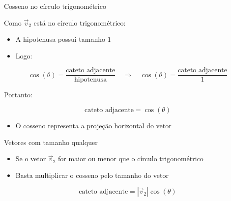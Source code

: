 \documentclass{beamer}
\begin{document}
\begin{frame}{Cosseno no círculo trigonométrico}


\vspace{0.5cm}

Como $\vec{v}_2$ está no círculo trigonométrico:

\begin{itemize}
    \item A hipotenusa possui tamanho $1$
    \item Logo:
\end{itemize}

\vspace{0.5cm}

\[
\cos(\theta)
=
\frac{\text{cateto adjacente}}
{\text{hipotenusa}}
\quad
\Longrightarrow
\quad
\cos(\theta)
=
\frac{\text{cateto adjacente}}{1}
\]
\vspace{0.5cm}

Portanto:

\[
\boxed{
\text{cateto adjacente} = \cos(\theta)
}
\]

\vspace{0.4cm}

\begin{itemize}
    \item O cosseno representa a projeção horizontal do vetor
\end{itemize}

\end{frame}
\begin{frame}{Vetores com tamanho qualquer}


\vspace{0.5cm}

\begin{itemize}

    \item Se o vetor $\vec{v}_2$ for maior ou menor que o círculo trigonométrico

    \item Basta multiplicar o cosseno pelo tamanho do vetor

\end{itemize}

\vspace{0.5cm}

\[
\boxed{
\text{cateto adjacente}
=
|\vec{v}_2| \cos(\theta)
}
\]

\vspace{0.4cm}

\end{frame}
\end{document}
